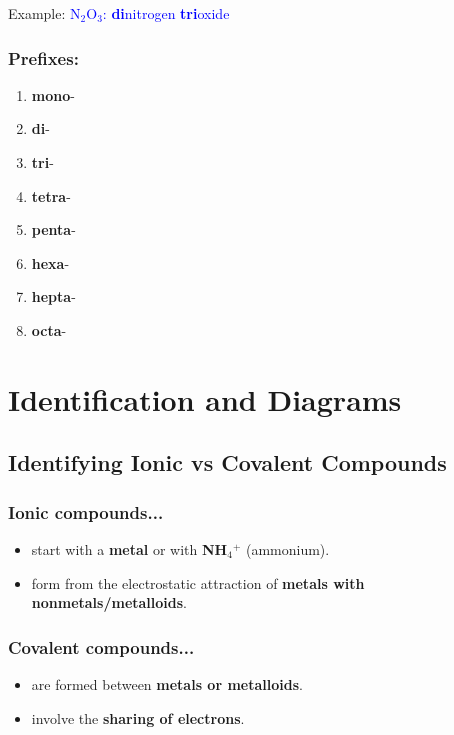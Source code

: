 \documentclass[a4paper, 12pt]{article}
\begin{document}
Example: \textcolor{blue}{N$_2$O$_3$: \textbf{di}nitrogen \textbf{tri}oxide}

\subsubsection*{Prefixes:}
\begin{enumerate}[leftmargin=*,nosep]
    \item \textbf{mono}-
    \item \textbf{di}-
    \item \textbf{tri}-
    \item \textbf{tetra}-
    \item \textbf{penta}-
    \item \textbf{hexa}-
    \item \textbf{hepta}-
    \item \textbf{octa}-
\end{enumerate}

\section{Identification and Diagrams}

\subsection*{Identifying Ionic vs Covalent Compounds}

\subsubsection*{Ionic compounds...}
\begin{itemize}[leftmargin=*,nosep]
    \item start with a \textbf{metal} or with \textbf{NH$_4$$^+$} (ammonium).
    \item form from the electrostatic attraction of \textbf{metals with nonmetals/metalloids}.
\end{itemize}

\subsubsection*{Covalent compounds...}
\begin{itemize}[leftmargin=*,nosep]
    \item are formed between \textbf{metals or metalloids}.
    \item involve the \textbf{sharing of electrons}.
\end{itemize}
\end{document}
